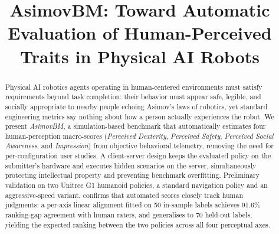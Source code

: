\documentclass[conference]{IEEEtran}
\begin{document}
\title{AsimovBM: Toward Automatic Evaluation of Human-Perceived Traits in Physical AI Robots}

\author{
}


\maketitle


\begin{abstract}
	Physical AI robotics agents operating in human-centered environments must
	satisfy requirements beyond task completion: their behavior must appear safe,
	legible, and socially appropriate to nearby people echoing Asimov's laws of robotics, yet standard engineering
	metrics say nothing about how a person actually experiences the robot.
	We present \textit{AsimovBM}, a simulation-based benchmark that automatically
	estimates four human-perception macro-scores (\textit{Perceived Dexterity},
	\textit{Perceived Safety}, \textit{Perceived Social Awareness}, and
	\textit{Impression}) from objective behavioral telemetry, removing the need
	for per-configuration user studies.
	A client-server design keeps the evaluated policy on the submitter's hardware
	and executes hidden scenarios on the server, simultaneously protecting
	intellectual property and preventing benchmark overfitting.
	Preliminary validation on two Unitree G1 humanoid policies, a standard
	navigation policy and an aggressive-speed variant, confirms that automated
	scores closely track human judgments: a per-axis linear alignment fitted on
	50 in-sample labels achieves 91.6\% ranking-gap agreement with human raters,
	and generalises to 70 held-out labels, yielding the expected ranking between
	the two policies across all four perceptual axes.
\end{abstract}
\end{document}
